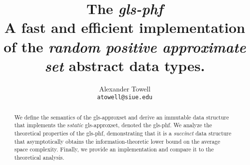 \documentclass[11pt,final,hidelinks]{article}
\title
{
    The \emph{\gls*{gls-phf}}\\
    \large A fast and efficient implementation of the \emph{random positive approximate set} abstract data types.
}
\author
{
    Alexander Towell\\
    \texttt{atowell@siue.edu}
}
\date{}
\begin{document}
\maketitle
\begin{abstract}
We define the semantics of the \gls*{gls-approxset} and derive an immutable data structure that implements the s\emph{static} \gls*{gls-approxset}, denoted the \gls*{gls-phf}. We analyze the theoretical properties of the \gls*{gls-phf}, demonstrating that it is a \emph{succinct} data structure that asymptotically obtains the information-theoretic lower bound on the average space complexity. Finally, we provide an implementation and compare it to the theoretical analysis.
\end{abstract}

\tableofcontents
\listoffigures
\listofalgorithms



%






\printglossary

\end{document}
